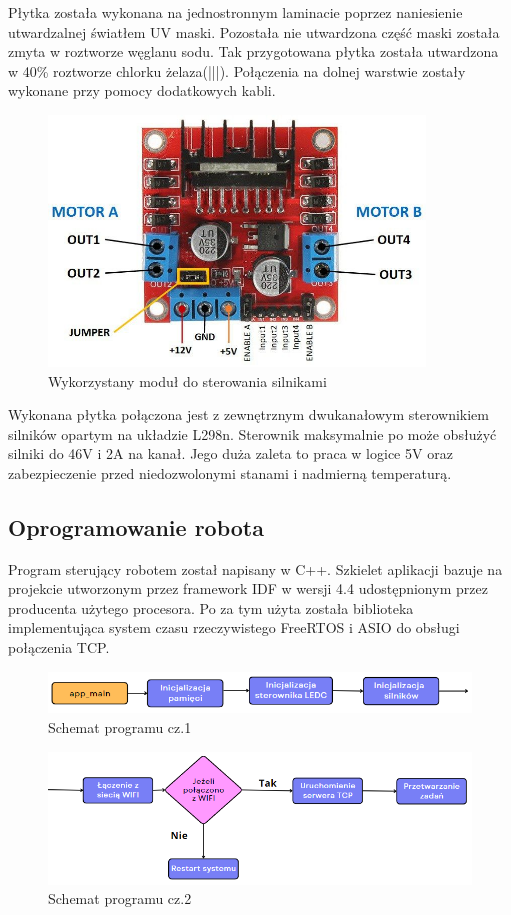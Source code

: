 Płytka została wykonana na jednostronnym laminacie poprzez naniesienie utwardzalnej światłem UV maski. Pozostała nie utwardzona część maski 
została zmyta w roztworze węglanu sodu. Tak przygotowana płytka została utwardzona w 40\% roztworze chlorku żelaza(|||). 
Połączenia na dolnej warstwie zostały wykonane przy pomocy dodatkowych kabli. 

\begin{figure}[H]
	\centering
	\includegraphics[width=10cm]{pages/robot/zdjecia/l298n_modul.jpg}
	\caption{Wykorzystany moduł do sterowania silnikami}
	\label{Fig:modulL298}
\end{figure}

Wykonana płytka połączona jest z zewnętrznym dwukanałowym sterownikiem silników opartym na układzie L298n. 
Sterownik maksymalnie po może obsłużyć silniki do 46V i 2A na kanał. Jego duża zaleta to praca w logice 5V 
oraz zabezpieczenie przed niedozwolonymi stanami i nadmierną temperaturą. 


\subsection{Oprogramowanie robota}

Program sterujący robotem został napisany w C++. 
Szkielet aplikacji bazuje na projekcie utworzonym przez framework IDF w wersji 4.4 udostępnionym 
przez producenta użytego procesora. Po za tym użyta została biblioteka implementująca 
system czasu rzeczywistego FreeRTOS i ASIO do obsługi połączenia TCP. 
\begin{figure}[H]
	\centering
	\includegraphics[width=14cm]{pages/robot/zdjecia/schematy/softSchematCz1.png}
	\caption{Schemat programu cz.1 }
	\label{Fig:Rysunek}
\end{figure}
\begin{figure}[H]
	\centering
	\includegraphics[width=14cm]{pages/robot/zdjecia/schematy/softSchematCz2.png}
	\caption{Schemat programu cz.2}
	\label{Fig:Rysunek}
\end{figure}

